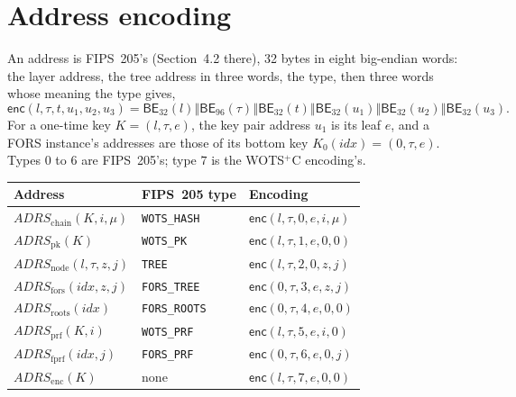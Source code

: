 \documentclass[11pt]{article}
\newcommand{\BE}{\mathsf{BE}}
\newcommand{\concat}{\mathbin\Vert}
\newcommand{\addr}{\mathit{ADRS}}
\newcommand{\idx}{\mathit{idx}}
\begin{document}
\appendix
\section{Address encoding}
\label{sec:tweaks}

An address is FIPS~205's (Section~4.2 there), 32 bytes in eight big-endian words: the layer address, the tree address in three words, the type, then three words whose meaning the type gives,
\[
  \mathsf{enc}(l,\tau,t,u_1,u_2,u_3)=\BE_{32}(l)\concat\BE_{96}(\tau)\concat\BE_{32}(t)\concat\BE_{32}(u_1)\concat\BE_{32}(u_2)\concat\BE_{32}(u_3).
\]
For a one-time key $K=(l,\tau,e)$, the key pair address $u_1$ is its leaf $e$, and a FORS instance's addresses are those of its bottom key $K_0(\idx)=(0,\tau,e)$. Types $0$ to $6$ are FIPS~205's; type $7$ is the WOTS$^+$C encoding's.

\begin{center}
\small
\begin{tabular}{@{}lll@{}}
\toprule
Address & FIPS~205 type & Encoding\\
\midrule
$\addr_{\mathrm{chain}}(K,i,\mu)$ & \texttt{WOTS\_HASH} & $\mathsf{enc}(l,\tau,0,e,i,\mu)$\\
$\addr_{\mathrm{pk}}(K)$ & \texttt{WOTS\_PK} & $\mathsf{enc}(l,\tau,1,e,0,0)$\\
$\addr_{\mathrm{node}}(l,\tau,z,j)$ & \texttt{TREE} & $\mathsf{enc}(l,\tau,2,0,z,j)$\\
$\addr_{\mathrm{fors}}(\idx,z,j)$ & \texttt{FORS\_TREE} & $\mathsf{enc}(0,\tau,3,e,z,j)$\\
$\addr_{\mathrm{roots}}(\idx)$ & \texttt{FORS\_ROOTS} & $\mathsf{enc}(0,\tau,4,e,0,0)$\\
$\addr_{\mathrm{prf}}(K,i)$ & \texttt{WOTS\_PRF} & $\mathsf{enc}(l,\tau,5,e,i,0)$\\
$\addr_{\mathrm{fprf}}(\idx,j)$ & \texttt{FORS\_PRF} & $\mathsf{enc}(0,\tau,6,e,0,j)$\\
$\addr_{\mathrm{enc}}(K)$ & none & $\mathsf{enc}(l,\tau,7,e,0,0)$\\
\bottomrule
\end{tabular}
\end{center}



\end{document}
